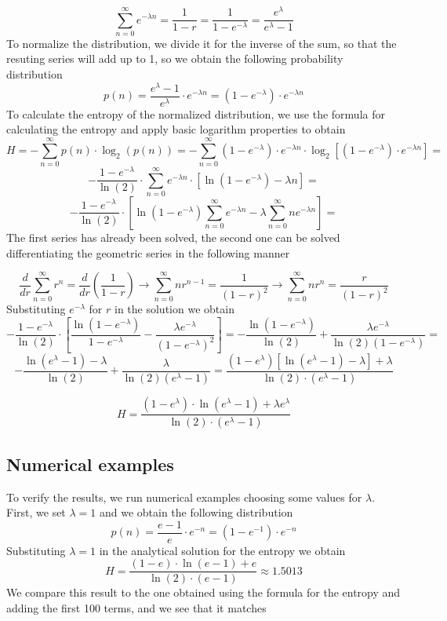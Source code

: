 \[ 
	\sum_{n=0}^{\infty} e^{- \lambda n} =
	\frac{1}{1 - r} = \frac{1}{1 - e^{- \lambda}} =
	\frac{e^{\lambda}}{e^{\lambda} - 1}
\]
To normalize the distribution, we divide it for the inverse of the sum, so that the resuting series will add up to 1, so we obtain the following probability distribution
\[ 
	p(n) =
	\frac{e^{\lambda} - 1}{e^{\lambda}} \cdot e^{- \lambda n} =
	(1 - e^{-\lambda}) \cdot e^{- \lambda n}
\]
To calculate the entropy of the normalized distribution, we use the formula for calculating the entropy and apply basic logarithm properties to obtain
\[ 
	H = - \sum_{n=0}^{\infty} p(n) \cdot \log_2(p(n)) =
	- \sum_{n=0}^{\infty} 
		(1 - e^{-\lambda}) \cdot e^{- \lambda n}
	\cdot \log_2[
		(1 - e^{-\lambda}) \cdot e^{- \lambda n}
	] =
\]
\[ 
	- \frac{1 - e^{-\lambda}}{\ln(2)}  \cdot 
	\sum_{n=0}^{\infty}  e^{- \lambda n}
	\cdot 
		[ \ln(1 - e^{-\lambda}) - \lambda n]
	= 
\]
\[
	- \frac{1 - e^{-\lambda}}{\ln(2)}  \cdot 
	\left[ 
		\ln(1 - e^{-\lambda}) 
		\sum_{n=0}^{\infty} 
		e^{-\lambda n} -
		\lambda \sum_{n=0}^{\infty}
		n e^{-\lambda n}
	\right] =
\]
The first series has already been solved, the second one can be solved differentiating the geometric series in the following manner

\[ 
	\frac{d}{dr} \sum_{n=0}^{\infty} r^n =
	\frac{d}{dr} \left(
	\frac{1}{1 - r}
	\right)
	\rightarrow
	\sum_{n=0}^{\infty} nr^{n-1} =
	\frac{1}{(1 - r)^2}
	\rightarrow
	\sum_{n=0}^{\infty} nr^n =
	\frac{r}{(1 - r)^2}
\]
Substituting $e^{-\lambda}$ for $r$ in the solution we obtain
\[ 
	- \frac{1 - e^{-\lambda}}{\ln(2)}  \cdot 
	\left[ 
	\frac{\ln(1 - e^{-\lambda})}{1 - e^{-\lambda}} -
	\frac{\lambda e^{-\lambda}}{(1 - e^{-\lambda})^2}
	\right] =
	- \frac{\ln(1 - e^{-\lambda})}{\ln(2)}
	+ \frac{\lambda e^{-\lambda}}
	{\ln(2) (1 - e^{-\lambda}) } = 
\]
\[ 
	- \frac{\ln(e^{\lambda} - 1) - \lambda}
	{\ln(2)}
	+ \frac{\lambda}
	{\ln(2) (e^{\lambda} - 1) } =
	\frac{
		(1 - e^{\lambda})
		\left[
			\ln(e^{\lambda} - 1) - \lambda
		\right]
		+ \lambda
	}
	{\ln(2) \cdot (e^{\lambda} - 1)}
\]

\[
	H =
	\frac{
		(1 - e^{\lambda}) \cdot \ln(e^{\lambda} - 1) +
		\lambda e^{\lambda}
	}	
	{
		\ln(2) \cdot (e^{\lambda} - 1)
	}
\]

\subsection{Numerical examples}

To verify the results, we run numerical examples choosing some values for $\lambda$. \newline
First, we set $\lambda = 1$ and we obtain the following distribution
\[ 
	p(n) =
	\frac{e - 1}{e} \cdot e^{-n} =
	(1 - e^{-1}) \cdot e^{-n}
\]
Substituting $\lambda = 1$ in the analytical solution for the entropy we obtain
\[
	H = \frac{(1 - e) \cdot \ln(e - 1) + e}
	{\ln(2) \cdot (e - 1)} \approx 1.5013
\]
We compare this result to the one obtained using the formula for the entropy and adding the first 100 terms, and we see that it matches

